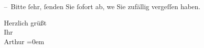 \pstart
           – Bitte{ }ſehr,{ }ſenden Sie{ }ſofort ab, we{\geminationn} Sie zufällig
               vergeſſen {\pb}haben.\pend
           
\pstart
           Herzlich grüßt{\\[\baselineskip]}Ihr{\\[\baselineskip]}\spacefill\mbox{Arthur}\pend
           \leftskip=0em{}\endnumbering{}  \newcommand{\dateiname}{L00341}\newcommand{\titel}{Arthur Schnitzler an Richard Beer-Hofmann, [zwischen 26. – 29. 6. 1894?]}\newcommand{\editorInnen}{Martin Anton Müller und Gerd-Hermann Susen}
